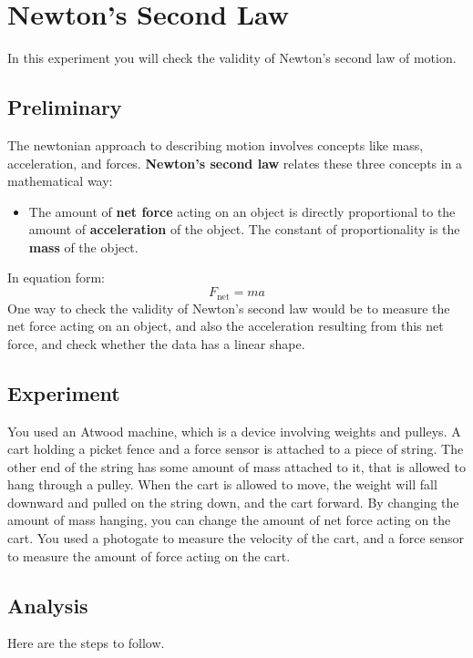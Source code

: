 \chapter{Newton's Second Law}
%
In this experiment you will check the validity of Newton's second law of motion.
%
\section{Preliminary}
%
The newtonian approach to describing motion involves concepts like mass, acceleration, and forces. \textbf{Newton's second law} relates these three concepts in a mathematical way:
\begin{itemize}
    \item The amount of \textbf{net force} acting on an object is directly proportional to the amount of \textbf{acceleration} of the object. The constant of proportionality is the \textbf{mass} of the object.
\end{itemize}
In equation form:
\begin{equation}
    F_{\text{net}} = m a
    \label{eq:04.Fma}
\end{equation}
One way to check the validity of Newton's second law would be to measure the net force acting on an object, and also the acceleration resulting from this net force, and check whether the data has a linear shape.
%
\section{Experiment}
%
You used an Atwood machine, which is a device involving weights and pulleys. A cart holding a picket fence and a force sensor is attached to a piece of string. The other end of the string has some amount of mass attached to it, that is allowed to hang through a pulley. When the cart is allowed to move, the weight will fall downward and pulled on the string down, and the cart forward. By changing the amount of mass hanging, you can change the amount of net force acting on the cart. You used a photogate to measure the velocity of the cart, and a force sensor to measure the amount of force acting on the cart.
%
\section{Analysis}
%
Here are the steps to follow.
%
